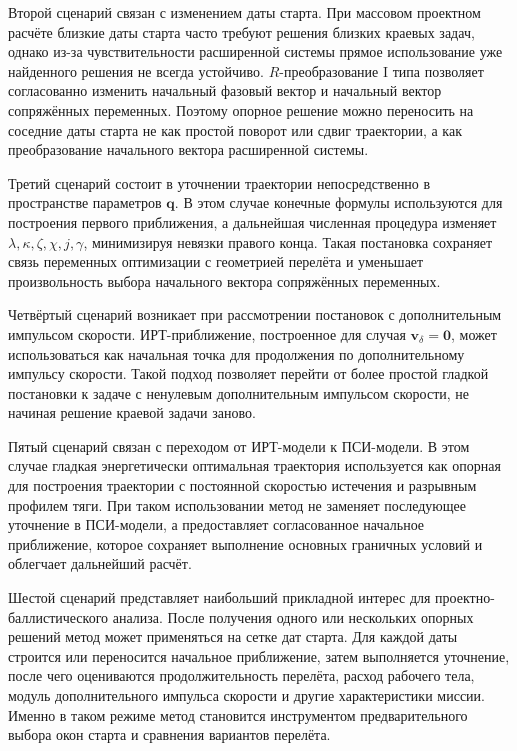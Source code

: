 Второй сценарий связан с изменением даты старта. При массовом проектном расчёте близкие даты старта часто требуют решения близких краевых задач, однако из-за чувствительности расширенной системы прямое использование уже найденного решения не всегда устойчиво. \(R\)-преобразование I типа позволяет согласованно изменить начальный фазовый вектор и начальный вектор сопряжённых переменных. Поэтому опорное решение можно переносить на соседние даты старта не как простой поворот или сдвиг траектории, а как преобразование начального вектора расширенной системы.

Третий сценарий состоит в уточнении траектории непосредственно в пространстве параметров \(\mathbf q\). В этом случае конечные формулы используются для построения первого приближения, а дальнейшая численная процедура изменяет \(\lambda,\kappa,\zeta,\chi,j,\gamma\), минимизируя невязки правого конца. Такая постановка сохраняет связь переменных оптимизации с геометрией перелёта и уменьшает произвольность выбора начального вектора сопряжённых переменных.

Четвёртый сценарий возникает при рассмотрении постановок с дополнительным импульсом скорости. ИРТ-приближение, построенное для случая \(\mathbf v_\delta=\mathbf 0\), может использоваться как начальная точка для продолжения по дополнительному импульсу скорости. Такой подход позволяет перейти от более простой гладкой постановки к задаче с ненулевым дополнительным импульсом скорости, не начиная решение краевой задачи заново.

Пятый сценарий связан с переходом от ИРТ-модели к ПСИ-модели. В этом случае гладкая энергетически оптимальная траектория используется как опорная для построения траектории с постоянной скоростью истечения и разрывным профилем тяги. При таком использовании метод не заменяет последующее уточнение в ПСИ-модели, а предоставляет согласованное начальное приближение, которое сохраняет выполнение основных граничных условий и облегчает дальнейший расчёт.

Шестой сценарий представляет наибольший прикладной интерес для проектно-баллистического анализа. После получения одного или нескольких опорных решений метод может применяться на сетке дат старта. Для каждой даты строится или переносится начальное приближение, затем выполняется уточнение, после чего оцениваются продолжительность перелёта, расход рабочего тела, модуль дополнительного импульса скорости и другие характеристики миссии. Именно в таком режиме метод становится инструментом предварительного выбора окон старта и сравнения вариантов перелёта.

